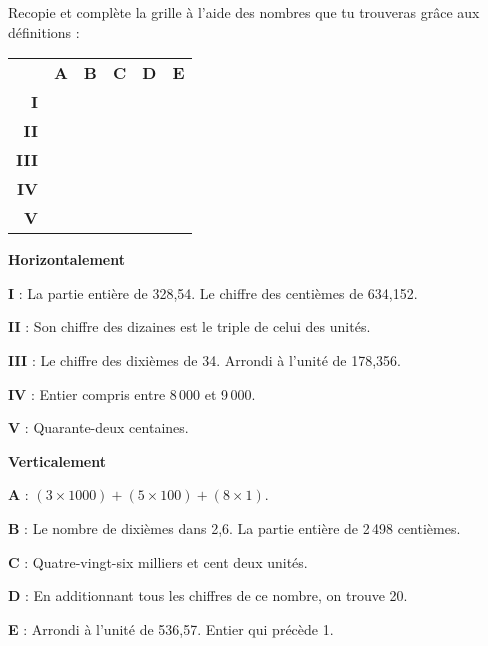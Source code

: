 \begin{exercice}
Recopie et complète la grille à l'aide des nombres que tu trouveras grâce aux définitions :

\begin{center}
\begin{tabularx}{.5\linewidth}{r|c|c|c|c|c|}
\multicolumn{1}{c}{}& \multicolumn{1}{c}{\textbf{A}} & \multicolumn{1}{c}{\textbf{B}} & \multicolumn{1}{c}{\textbf{C}} & \multicolumn{1}{c}{\textbf{D}} & \multicolumn{1}{c}{\textbf{E}} \\ \cline{2-6}
\textbf{I} & & & & \cellcolor{black} & \\ \cline{2-6} 
\textbf{II} & & & & & \\ \cline{2-6} 
\textbf{III} & & \cellcolor{black} & & & \\ \cline{2-6} 
\textbf{IV} & & & & & \cellcolor{black} \\ \cline{2-6} 
\textbf{V} & \cellcolor{black} & & & & \\ \cline{2-6} 
\end{tabularx}
\end{center}

\vspace{0.75em}

\textbf{Horizontalement}

\textbf{I} : La partie entière de 328,54. Le chiffre des centièmes de 634,152.

\textbf{II} : Son chiffre des dizaines est le triple de celui des unités.

\textbf{III} : Le chiffre des dixièmes de 34. Arrondi à l'unité de 178,356.

\textbf{IV} : Entier compris entre 8\,000 et 9\,000.

\textbf{V} : Quarante-deux centaines.

\vspace{0.75em}

\textbf{Verticalement}

\textbf{A} : $(3 \times 1 000) + (5 \times 100) + (8 \times 1)$.

\textbf{B} : Le nombre de dixièmes dans 2,6. La partie entière de 2\,498 centièmes.

\textbf{C} : Quatre-vingt-six milliers et cent deux unités.

\textbf{D} : En additionnant tous les chiffres de ce nombre, on trouve 20.

\textbf{E} : Arrondi à l'unité de 536,57. Entier qui précède 1.

\end{exercice}


